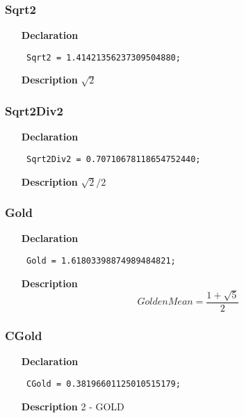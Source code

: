 \documentclass[12pt,a4paper,oneside]{report}
\newcommand{\declarationitem}[1]{\textbf{#1}}
\newcommand{\descriptiontitle}[1]{\textbf{#1}}
\newcommand{\code}[1]{\texttt{#1}}
\begin{document}
\subsubsection{Sqrt2}
\label{utypes-Sqrt2}
\begin{itemize}\item[\declarationitem{Declaration}\hfill]
	\begin{flushleft}
		\code{
			Sqrt2      = 1.41421356237309504880;}
		
	\end{flushleft}
	
	\par
	\item[\descriptiontitle{Description}]
	$\sqrt{2}$
	
\end{itemize}
\subsubsection{Sqrt2Div2}
\label{utypes-Sqrt2Div2}
\begin{itemize}\item[\declarationitem{Declaration}\hfill]
	\begin{flushleft}
		\code{
			Sqrt2Div2  = 0.70710678118654752440;}
		
	\end{flushleft}
	
	\par
	\item[\descriptiontitle{Description}]
	$\sqrt{2}/2$
	
\end{itemize}
\subsubsection{Gold}
\label{utypes-Gold}
\begin{itemize}\item[\declarationitem{Declaration}\hfill]
	\begin{flushleft}
		\code{
			Gold       = 1.61803398874989484821;}
		
	\end{flushleft}
	
	\par
	\item[\descriptiontitle{Description}]
$$
Golden Mean = \frac{1 + \sqrt{5}}{2}
$$
	
\end{itemize}
\subsubsection{CGold}
\label{utypes-CGold}
\begin{itemize}\item[\declarationitem{Declaration}\hfill]
	\begin{flushleft}
		\code{
			CGold      = 0.38196601125010515179;}
		
	\end{flushleft}
	
	\par
	\item[\descriptiontitle{Description}]
	2 {-} GOLD
	
\end{itemize}
\end{document}
